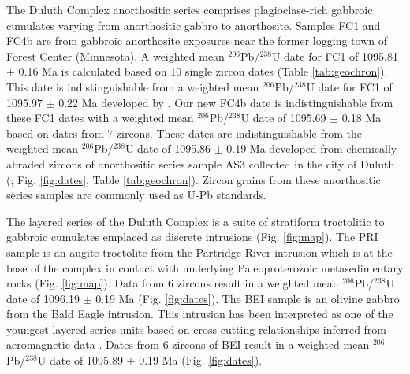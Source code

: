 \documentclass[11pt,letterpaper]{article}
\begin{document}
The Duluth Complex anorthositic series comprises plagioclase-rich gabbroic cumulates varying from anorthositic gabbro to anorthosite. Samples FC1 and FC4b are from gabbroic anorthosite exposures near the former logging town of Forest Center (Minnesota). A weighted mean $^{206}$Pb/$^{238}$U date for FC1 of 1095.81 $\pm$ 0.16 Ma is calculated based on 10 single zircon dates (Table \ref{tab:geochron}). This date is indistinguishable from a weighted mean $^{206}$Pb/$^{238}$U date for FC1 of 1095.97 $\pm$ 0.22 Ma developed by \cite{Ibanez-Mejia2019a}. Our new FC4b date is indistinguishable from these FC1 dates with a weighted mean $^{206}$Pb/$^{238}$U date of 1095.69 $\pm$ 0.18 Ma based on dates from 7 zircons. These dates are indistinguishable from the weighted mean $^{206}$Pb/$^{238}$U date of 1095.86 $\pm$ 0.19 Ma developed from chemically-abraded zircons of anorthositic series sample AS3 collected in the city of Duluth (\citealp{Schoene2006a}; Fig. \ref{fig:dates}, Table \ref{tab:geochron}). Zircon grains from these anorthositic series samples are commonly used as U-Pb standards.

The layered series of the Duluth Complex is a suite of stratiform troctolitic to gabbroic cumulates emplaced as discrete intrusions (Fig. \ref{fig:map}). The PRI sample is an augite troctolite from the Partridge River intrusion which is at the base of the complex in contact with underlying Paleoproterozoic metasedimentary rocks (Fig. \ref{fig:map}). Data from 6 zircons result in a weighted mean $^{206}$Pb/$^{238}$U date of 1096.19 $\pm$ 0.19 Ma (Fig. \ref{fig:dates}). The BEI sample is an olivine gabbro from the Bald Eagle intrusion. This intrusion has been interpreted as one of the youngest layered series units based on cross-cutting relationships inferred from aeromagnetic data \citep{Miller2002c}. Dates from 6 zircons of BEI result in a weighted mean $^{206}$Pb/$^{238}$U date of 1095.89 $\pm$ 0.19 Ma (Fig. \ref{fig:dates}).
\end{document}

